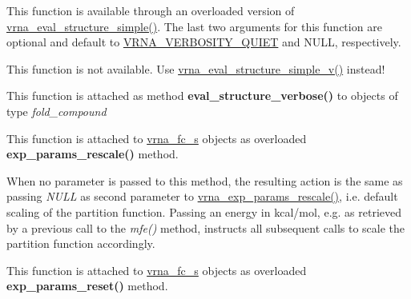 \begin{DoxyRefList}
\item[Global \mbox{\hyperlink{group__eval_gacd6278343e77d13f1d53588e50d303bc}{vrna\+\_\+eval\+\_\+structure\+\_\+simple\+\_\+v}} (const char $\ast$string, const char $\ast$structure, int verbosity\+\_\+level, F\+I\+LE $\ast$file)]\label{wrappers__wrappers000063}%
%
 This function is available through an overloaded version of \mbox{\hyperlink{group__eval_ga7e5273464b775d4130245681312c1369}{vrna\+\_\+eval\+\_\+structure\+\_\+simple()}}. The last two arguments for this function are optional and default to \mbox{\hyperlink{group__eval_gaf4afe19780b61b4962c613bde324128b}{V\+R\+N\+A\+\_\+\+V\+E\+R\+B\+O\+S\+I\+T\+Y\+\_\+\+Q\+U\+I\+ET}} and N\+U\+LL, respectively.  
\item[Global \mbox{\hyperlink{group__eval_gaf928bfd96767e1b8033a95a4cc432e39}{vrna\+\_\+eval\+\_\+structure\+\_\+simple\+\_\+verbose}} (const char $\ast$string, const char $\ast$structure, F\+I\+LE $\ast$file)]\label{wrappers__wrappers000061}%
%
 This function is not available. Use \mbox{\hyperlink{group__eval_gacd6278343e77d13f1d53588e50d303bc}{vrna\+\_\+eval\+\_\+structure\+\_\+simple\+\_\+v()}} instead!  
\item[Global \mbox{\hyperlink{group__eval_ga0928d699d310178f84ee2351034e5cb5}{vrna\+\_\+eval\+\_\+structure\+\_\+verbose}} (vrna\+\_\+fold\+\_\+compound\+\_\+t $\ast$vc, const char $\ast$structure, F\+I\+LE $\ast$file)]\label{wrappers__wrappers000045}%
%
 This function is attached as method {\bfseries{eval\+\_\+structure\+\_\+verbose()}} to objects of type {\itshape fold\+\_\+compound}  
\item[Global \mbox{\hyperlink{group__energy__parameters_gad607bc3a5b5da16400e2ca4ea5560233}{vrna\+\_\+exp\+\_\+params\+\_\+rescale}} (vrna\+\_\+fold\+\_\+compound\+\_\+t $\ast$vc, double $\ast$mfe)]\label{wrappers__wrappers000095}%
%
 This function is attached to \mbox{\hyperlink{group__fold__compound_structvrna__fc__s}{vrna\+\_\+fc\+\_\+s}} objects as overloaded {\bfseries{exp\+\_\+params\+\_\+rescale()}} method.

When no parameter is passed to this method, the resulting action is the same as passing {\itshape N\+U\+LL} as second parameter to \mbox{\hyperlink{group__energy__parameters_gad607bc3a5b5da16400e2ca4ea5560233}{vrna\+\_\+exp\+\_\+params\+\_\+rescale()}}, i.\+e. default scaling of the partition function. Passing an energy in kcal/mol, e.\+g. as retrieved by a previous call to the {\itshape mfe()} method, instructs all subsequent calls to scale the partition function accordingly.  
\item[Global \mbox{\hyperlink{group__energy__parameters_gaa5409218068be84d7b50c78fbdaa85a9}{vrna\+\_\+exp\+\_\+params\+\_\+reset}} (vrna\+\_\+fold\+\_\+compound\+\_\+t $\ast$vc, vrna\+\_\+md\+\_\+t $\ast$md\+\_\+p)]\label{wrappers__wrappers000097}%
%
 This function is attached to \mbox{\hyperlink{group__fold__compound_structvrna__fc__s}{vrna\+\_\+fc\+\_\+s}} objects as overloaded {\bfseries{exp\+\_\+params\+\_\+reset()}} method.


\end{DoxyRefList}
